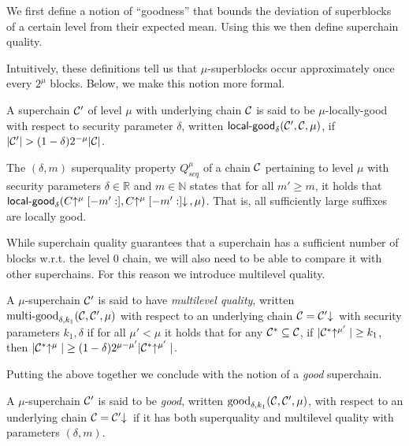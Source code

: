 We first define a notion of ``goodness'' that bounds the deviation of
superblocks of a certain level from their expected mean. Using this we then
define superchain quality.

Intuitively, these definitions tell us that $\mu$-superblocks occur
approximately once every $2^\mu$ blocks. Below, we make this notion more formal.

\begin{definition}
A superchain $\mathcal{C}'$ of level
$\mu$ with underlying chain $\mathcal{C}$ is said to be $\mu$-\textnormal{locally-good}
with respect to security parameter $\delta$, written
$\textsf{local-good}_{\delta}(\mathcal{C}', \mathcal{C}, \mu)$, if $|\mathcal{C}'| > (1 -
\delta)2^{-\mu}|\mathcal{C}|$.
\end{definition}

\begin{definition}
The $(\delta, m)$ superquality property $Q^\mu_{scq}$ of a chain $\mathcal{C}$
pertaining to level $\mu$ with security parameters $\delta \in \mathbb{R}$ and
$m \in \mathbb{N}$ states that for all $m' \geq m$, it holds that
$\textsf{local-good}_{\delta}(C\negthickspace\uparrow^\mu[-m':],
C\negthickspace\uparrow^\mu[-m':]\negthickspace\downarrow\,, \mu)$. That is, all sufficiently large suffixes
are locally good.
\end{definition}

While superchain quality guarantees that a superchain has a sufficient number
of blocks w.r.t. the level 0 chain, we will also need to be able to compare
it with other superchains. For this reason we introduce multilevel quality.

\begin{definition}
A $\mu$-superchain $\mathcal{C}'$ is said to have \textit{multilevel quality}, written
$\textnormal{multi-good}_{\delta, k_1}(\mathcal{C}, \mathcal{C}', \mu)$ with respect to an
underlying chain $\mathcal{C} = \mathcal{C}'\negthickspace\downarrow\,$ with security parameters $k_1,
\delta$ if for all $\mu' < \mu$ it holds that for any $\mathcal{C}^* \subseteq \mathcal{C}$,
if $|\mathcal{C}^*\negthickspace\uparrow^{\mu'}| \geq k_1$, then $|\mathcal{C}^*\negthickspace\uparrow^{\mu}| \geq (1 -
\delta)2^{\mu - \mu'}|\mathcal{C}^*\negthickspace\uparrow^{\mu'}|$.
\end{definition}


Putting the above together we conclude with the notion of a {\em good}
superchain.

\begin{definition}
\label{lem.good}
A $\mu$-superchain $\mathcal{C}'$
is said to be \textit{good}, written $\textnormal{good}_{\delta, k_1}(\mathcal{C},
\mathcal{C}', \mu)$, with respect to an underlying chain $\mathcal{C} = \mathcal{C}'\negthickspace\downarrow\,$
if it has both superquality and multilevel quality with parameters $(\delta,
m)$.
\end{definition}

